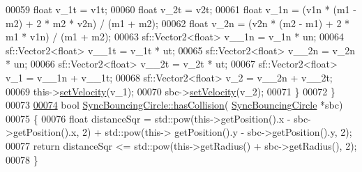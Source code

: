 \begin{DoxyCode}
00059         \textcolor{keywordtype}{float} v\_1t = v1t;
00060         \textcolor{keywordtype}{float} v\_2t = v2t;
00061         \textcolor{keywordtype}{float} v\_1n = (v1n * (m1 - m2) + 2 * m2 * v2n) / (m1 + m2);
00062         \textcolor{keywordtype}{float} v\_2n = (v2n * (m2 - m1) + 2 * m1 * v1n) / (m1 + m2);
00063         sf::Vector2<float> v\_\_1n = v\_1n * un;
00064         sf::Vector2<float> v\_\_1t = v\_1t * ut;
00065         sf::Vector2<float> v\_\_2n = v\_2n * un;
00066         sf::Vector2<float> v\_\_2t = v\_2t * ut;
00067         sf::Vector2<float> v\_1 = v\_\_1n + v\_\_1t;
00068         sf::Vector2<float> v\_2 = v\_\_2n + v\_\_2t;
00069         this->\hyperlink{class_sync_bouncing_circle_a1e732f9061d50b87b227f7b57b3834bd}{setVelocity}(v\_1);
00070         sbc->\hyperlink{class_sync_bouncing_circle_a1e732f9061d50b87b227f7b57b3834bd}{setVelocity}(v\_2);
00071     \}
00072 \}
00073 
\hypertarget{_sync_bouncing_circle_8cpp_source_l00074}{}\hyperlink{class_sync_bouncing_circle_ab4c66394f5604d08cc1c1738f33376b5}{00074} \textcolor{keywordtype}{bool} \hyperlink{class_sync_bouncing_circle_ab4c66394f5604d08cc1c1738f33376b5}{SyncBouncingCircle::hasCollision}(
      \hyperlink{class_sync_bouncing_circle}{SyncBouncingCircle} *sbc)
00075 \{
00076     \textcolor{keywordtype}{float} distanceSqr = std::pow(this->getPosition().x - sbc->getPosition().x, 2) + std::pow(this->
      getPosition().y - sbc->getPosition().y, 2);
00077     \textcolor{keywordflow}{return} distanceSqr <= std::pow(this->getRadius() + sbc->getRadius(), 2);
00078 \}
\end{DoxyCode}
